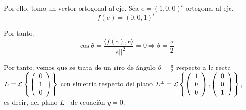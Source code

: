 \begin{ejercicio}
    Por ello, tomo un vector ortogonal al eje. Sea $e=(1,0,0)^t$ ortogonal al eje.
    \begin{equation*}
        f(e)=(0,0,1)^t
    \end{equation*}

    Por tanto,
    \begin{equation*}
        \cos \theta = \frac{\langle f(e), e\rangle}{||e||^2} = 0 \Longrightarrow \theta = \frac{\pi}{2}
    \end{equation*}

    Por tanto, vemos que se trata de un giro de ángulo $\theta=\frac{\pi}{2}$ respecto a la recta $L=\mathcal{L}\left\{\left(\begin{array}{c}
            0\\1\\0
        \end{array}\right)\right\}$ con simetría respecto del plano ${L}^\perp=\mathcal{L}\left\{\left(\begin{array}{c}
            1\\0\\0
        \end{array}\right),
        \left(\begin{array}{c}
            0\\0\\1
        \end{array}\right)\right\}$, es decir, del plano $L^\perp$ de ecuación $y=0$.
\end{ejercicio}


